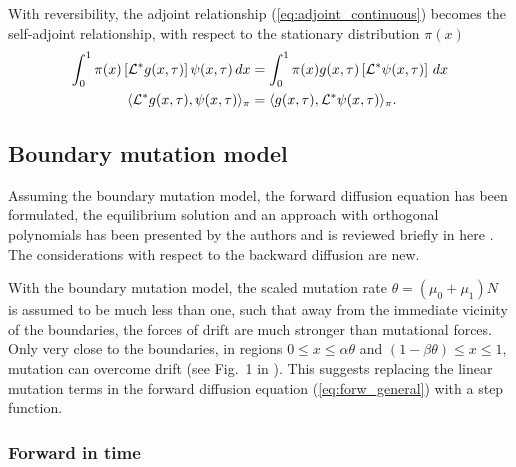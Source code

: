 \documentclass[preprint]{elsarticle}
\begin{document}
With reversibility, the adjoint relationship (\ref{eq:adjoint_continuous}) becomes the self-adjoint relationship, with respect to the stationary distribution $\pi(x)$ \citep{Song12}
\begin{equation}\label{eq:selfadjoint}
\begin{split}
\int_0^1 \pi(x) \left[{\cal L}^{*} g(x,\tau)\right]\psi(x,\tau)\,dx&=
\int_0^1  \pi(x)g(x,\tau)\left[{\cal L}^{*} \psi(x,\tau)\right]\,dx\\
\langle {\cal L}^{*} g(x,\tau),\psi(x,\tau) \rangle_{\pi}&=\langle g(x,\tau),{\cal L}^{*} \psi(x,\tau) \rangle_{\pi}.
\end{split}
\end{equation}

\subsection{Boundary mutation model}

Assuming the boundary mutation model, the forward diffusion equation has been formulated,  the equilibrium solution and an approach with orthogonal polynomials has been presented by the authors and is reviewed briefly in here \citep{Vogl14b,Vogl15,Vogl16}. The considerations with respect to the backward diffusion are new. 

With the  boundary mutation model, the scaled mutation rate $\theta=(\mu_0+\mu_1)N$ is assumed to be much less than one, such that away from the immediate vicinity of the boundaries, the forces of drift are much stronger than mutational forces. Only very close to the boundaries, in regions $0\leq x \leq\alpha\theta$ and $(1-\beta\theta) \leq x \leq 1$, mutation can overcome drift (see Fig.~1 in \citet{Vogl15}). This suggests replacing the linear mutation terms in the forward diffusion equation (\ref{eq:forw_general}) with a step function.

\subsubsection{Forward in time}
\end{document}
